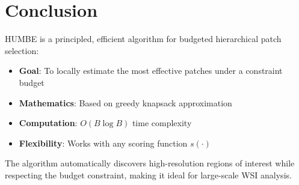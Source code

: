 \documentclass[11pt]{article}
\begin{document}
\section{Conclusion}

HUMBE is a principled, efficient algorithm for budgeted hierarchical patch selection:

\begin{itemize}
    \item \textbf{Goal}: To locally estimate the most effective patches under a constraint budget
    \item \textbf{Mathematics}: Based on greedy knapsack approximation
    \item \textbf{Computation}: $O(B \log B)$ time complexity
    \item \textbf{Flexibility}: Works with any scoring function $s(\cdot)$
\end{itemize}

The algorithm automatically discovers high-resolution regions of interest while respecting the budget constraint, making it ideal for large-scale WSI analysis.
\end{document}
